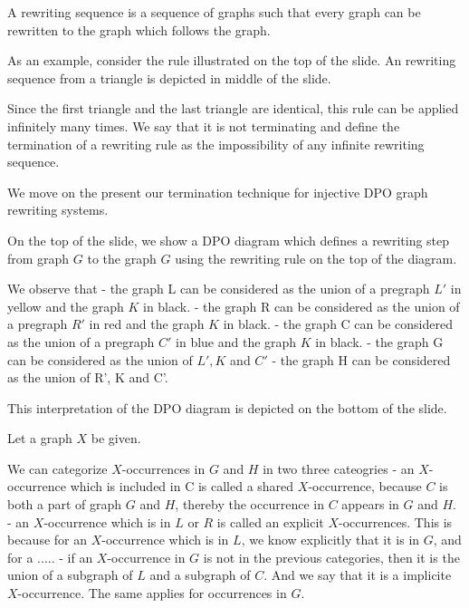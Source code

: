 A rewriting sequence is a sequence of graphs such that every graph can be rewritten to the graph which follows the graph.

As an example, consider the rule illustrated on the top of the slide. An rewriting sequence from a triangle is depicted in middle of the slide. 

Since the first triangle and the last triangle are identical, this rule can be applied infinitely many times. We say that it is not terminating and define the termination of a rewriting rule as the impossibility of any infinite rewriting sequence.

We move on the present our termination technique for injective DPO graph rewriting systems.

On the top of the slide, we show a DPO diagram which defines a rewriting step from graph $G$ to the graph $G$ using the rewriting rule on the top of the diagram. 

We observe that
    - the graph L can be considered as the union of a pregraph $L'$ in yellow and the graph $K$ in black. 
    - the graph R can be considered as the union of a pregraph $R'$ in red and the graph $K$ in black.
    - the graph C can be considered as the union of a pregraph $C'$ in blue and the graph $K$ in black.
    - the graph G can be considered as the union of $L',K$ and $C'$
    - the graph H can be considered as the union of R', K and C'.

This interpretation of the DPO diagram is depicted on the bottom of the slide.


Let a graph $X$ be given.

We can categorize $X$-occurrences in $G$ and $H$ in two three cateogries
    - an $X$-occurrence which is included in C is called a shared $X$-occurrence, because $C$ is both a part of graph $G$ and $H$, thereby the occurrence in $C$ appears in $G$ and $H$.
    - an $X$-occurrence which is in $L$ or $R$ is called an explicit $X$-occurrences. This is because for an $X$-occurrence which is in $L$, we know explicitly that it is in $G$, and for a .....
    - if an $X$-occurrence in $G$ is not in the previous categories, then it is the union of a subgraph of $L$ and a subgraph of $C$. And we say that it is a implicite $X$-occurrence. The same applies for occurrences in $G$.

